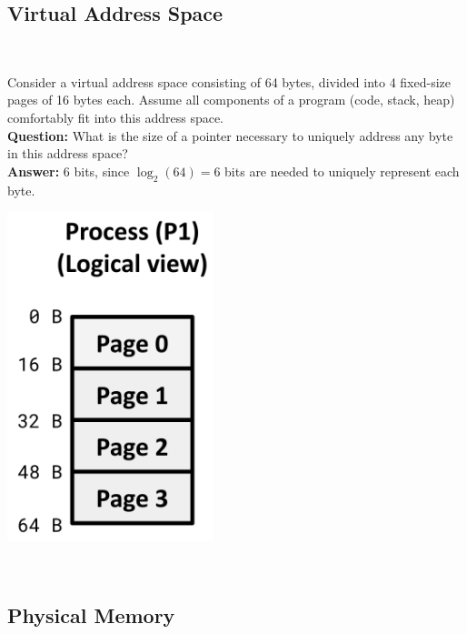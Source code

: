 \documentclass[../../compsys.tex]{subfiles}
\begin{document}
\subsection{Virtual Address Space}
\begin{example}
\leavevmode\\
\noindent
\begin{minipage}{0.55\textwidth}
  Consider a virtual address space consisting of 64 bytes, divided into 4 fixed-size pages of 16 bytes each. Assume all components of a program (code, stack, heap) comfortably fit into this address space.\\[5px]
\textbf{Question:} What is the size of a pointer necessary to uniquely address any byte in this address space?\\
\textbf{Answer:} 6 bits, since $\log_2(64) = 6$ bits are needed to uniquely represent each byte.
\end{minipage}%
\hfill
\vline
\hfill
\begin{minipage}{0.35\textwidth}
\begin{center}
  \includegraphics[width=0.45\textwidth]{chapters/L5/images/question.png}
\end{center}
\end{minipage}\\
\end{example}

\subsection{Physical Memory}
\end{document}

